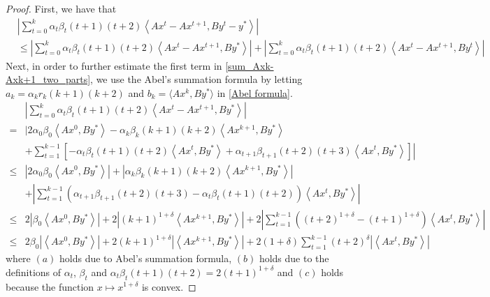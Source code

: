 \documentclass{article}
\numberwithin{equation}{section}
\begin{document}
\begin{proof}
    First, we have that 
    \begin{align}
        &\left| \sum\limits_{t = 0}^k\alpha_t\beta_{t}(t+1)(t+2)\left\langle Ax^t- Ax^{t+1},By^t-y^* \right\rangle \right| \nonumber \\
        &\leq \left| \sum\limits_{t = 0}^k\alpha_t\beta_{t}(t+1)(t+2)\left\langle Ax^t- Ax^{t+1},By^* \right\rangle \right|
        + \left| \sum\limits_{t = 0}^k\alpha_t\beta_{t}(t+1)(t+2)\left\langle Ax^t- Ax^{t+1},By^t \right\rangle \right|
        \label{sum_Axk-Axk+1_two_parts}
    \end{align}
    Next, in order to further estimate the first term in \eqref{sum_Axk-Axk+1_two_parts}, 
    we use the Abel's summation formula by letting $a_k = \alpha_kr_k(k+1)(k+2)$ and $b_k = \langle Ax^k,By^* \rangle$ in \eqref{Abel formula}.
    \begin{align} 
        &\left| \sum\limits_{t = 0}^k\alpha_t\beta_{t}(t+1)(t+2)\left\langle Ax^t- Ax^{t+1},By^* \right\rangle \right| \nonumber \\
        \overset{\mathop{(a)}}{=}& \Bigg| 2\alpha_0\beta_0 \left\langle Ax^0, By^* \right\rangle -\alpha_k\beta_{k}(k+1)(k+2)\left\langle  Ax^{k+1},By^* \right\rangle \nonumber \\
        &+ \left. \sum\limits_{t=1}^{k-1} \left[ -\alpha_t\beta_{t}(t+1)(t+2)\left\langle Ax^t, By^* \right\rangle
        +  \alpha_{t+1}\beta_{t+1}(t+2)(t+3)\left\langle Ax^t, By^* \right\rangle\right] \right|    \nonumber \\
        \leq &\left| 2\alpha_0\beta_0 \left\langle Ax^0, By^* \right\rangle \right| +\left|\alpha_k\beta_{k}(k+1)(k+2)\left\langle  Ax^{k+1},By^* \right\rangle\right| \nonumber \\
        &+\left| \sum\limits_{t=1}^{k-1} \left(\alpha_{t+1}\beta_{t+1}(t+2)(t+3) -\alpha_t\beta_{t}(t+1)(t+2)\right)\left\langle Ax^t, By^* \right\rangle\right| \nonumber \\
        \overset{\mathop{(b)}}{\leq} &2\left| \beta_0 \left\langle Ax^0, By^* \right\rangle \right|
        + 2\left|(k+1)^{1+\delta}\left\langle  Ax^{k+1},By^* \right\rangle\right|
        +2\left| \sum\limits_{t=1}^{k-1} \left((t+2)^{1+\delta} -(t+1)^{1+\delta}\right)\left\langle Ax^t, By^* \right\rangle\right| 
        \nonumber \\ 
        \overset{\mathop{(c)}}{\leq} & 2 \beta_0 \left|\left\langle Ax^0, By^* \right\rangle \right|
        + 2(k+1)^{1+\delta}\left|\left\langle  Ax^{k+1},By^* \right\rangle\right|
        +2(1+\delta) \sum\limits_{t=1}^{k-1} (t+2)^{\delta} \left|\left\langle Ax^t, By^* \right\rangle\right| 
        \label{Axk_Axk+1,By*}
    \end{align}
    where $(a)$ holds due to Abel's summation formula, $(b)$ holds due to the definitions 
    of $\alpha_t$, $\beta_{t}$ and $\alpha_t\beta_t(t+1)(t+2)=2(t+1)^{1+\delta}$ and $(c)$ holds because
    the function $x \mapsto x^{1+\delta}$ is convex.
    

\end{proof}
\end{document}
